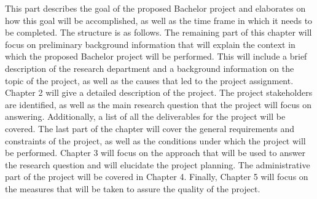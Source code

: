 This part describes the goal of the proposed Bachelor project and elaborates on how this goal will be accomplished, as well as the time frame in which it needs to be completed. The structure is as follows. The remaining part of this chapter will focus on preliminary background information that will explain the context in which the proposed Bachelor project will be performed. This will include a brief description of the research department and a background information on the topic of the project, as well as the causes that led to the project assignment. Chapter 2 will give a detailed description of the project. The project stakeholders are identified, as well as the main research question that the project will focus on answering. Additionally, a list of all the deliverables for the project will be covered. The last part of the chapter will cover the general requirements and constraints of the project, as well as the conditions under which the project will be performed. Chapter 3 will focus on the approach that will be used to answer the research question and will elucidate the project planning. The administrative part of the project will be covered in Chapter 4. Finally, Chapter 5 will focus on the measures that will be taken to assure the quality of the project.
